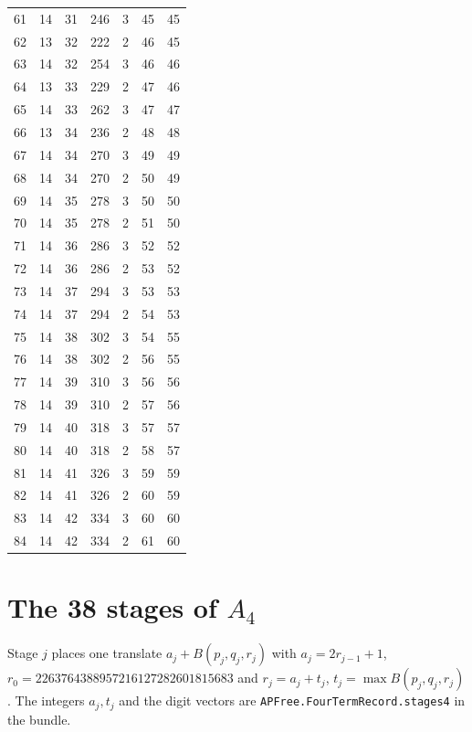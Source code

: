 \documentclass[11pt,a4paper]{article}
\theoremstyle{definition}
\theoremstyle{remark}
\newcommand{\Blk}{B}
\newcommand{\code}[1]{\texttt{#1}}
\begin{document}
\begin{center}
\begin{tabular}{@{}rrrrrrr@{}}
61 & 14 & 31 & 246 & 3 & 45 & 45 \\
62 & 13 & 32 & 222 & 2 & 46 & 45 \\
63 & 14 & 32 & 254 & 3 & 46 & 46 \\
64 & 13 & 33 & 229 & 2 & 47 & 46 \\
65 & 14 & 33 & 262 & 3 & 47 & 47 \\
66 & 13 & 34 & 236 & 2 & 48 & 48 \\
67 & 14 & 34 & 270 & 3 & 49 & 49 \\
68 & 14 & 34 & 270 & 2 & 50 & 49 \\
69 & 14 & 35 & 278 & 3 & 50 & 50 \\
70 & 14 & 35 & 278 & 2 & 51 & 50 \\
71 & 14 & 36 & 286 & 3 & 52 & 52 \\
72 & 14 & 36 & 286 & 2 & 53 & 52 \\
73 & 14 & 37 & 294 & 3 & 53 & 53 \\
74 & 14 & 37 & 294 & 2 & 54 & 53 \\
75 & 14 & 38 & 302 & 3 & 54 & 55 \\
76 & 14 & 38 & 302 & 2 & 56 & 55 \\
77 & 14 & 39 & 310 & 3 & 56 & 56 \\
78 & 14 & 39 & 310 & 2 & 57 & 56 \\
79 & 14 & 40 & 318 & 3 & 57 & 57 \\
80 & 14 & 40 & 318 & 2 & 58 & 57 \\
81 & 14 & 41 & 326 & 3 & 59 & 59 \\
82 & 14 & 41 & 326 & 2 & 60 & 59 \\
83 & 14 & 42 & 334 & 3 & 60 & 60 \\
84 & 14 & 42 & 334 & 2 & 61 & 60 \\
\bottomrule
\end{tabular}
\end{center}

\clearpage
\section{The 38 stages of \texorpdfstring{$A_4$}{A4}}\label{app:stages4}

Stage $j$ places one translate $a_j + \Blk(p_j,q_j,r_j)$ with $a_j = 2r_{j-1}+1$, $r_0 = 2263764388957216127282601815683$ and $r_j = a_j + t_j$, $t_j = \max\Blk(p_j,q_j,r_j)$. The integers $a_j, t_j$ and the digit vectors are \code{APFree.\allowbreak{}FourTermRecord.\allowbreak{}stages4} in the bundle.
\end{document}
